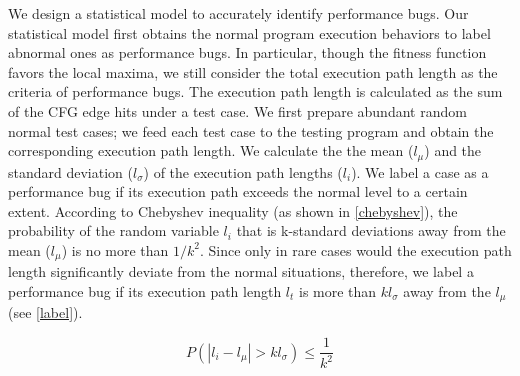 %
%

We design a statistical model to accurately identify performance bugs.
Our statistical model first obtains the normal program execution behaviors to label abnormal ones as performance bugs.
%
In particular, though the fitness function favors the local maxima, we still consider the total execution path length as the criteria of performance bugs.
%
The execution path length is calculated as the sum of the CFG edge hits under a test case.
%
We first prepare abundant random normal test cases;
%
we feed each test case to the testing program and obtain the corresponding execution path length.
%
We calculate the the mean ($l_{\mu}$) and the standard deviation ($l_{\sigma}$) of the execution path lengths ($l_i$).
%
We label a case as a performance bug if its execution path exceeds the normal level to a certain extent.
%
%
According to Chebyshev inequality (as shown in \autoref{chebyshev}),
%
the probability of the random variable $l_{i}$ that is k-standard deviations away from the mean ($l_{\mu}$) is no more than ${1}/{k^2}$.
%
Since only in rare cases would the execution path length significantly deviate from the normal situations,
%
therefore, we label a performance bug if its execution path length $l_{t}$ is more than $kl_{\sigma}$ away from the $l_{\mu}$ (see \autoref{label}).
%
%
%

\begin{equation} \label{chebyshev}
    P(|l_{i}-l_{\mu}| > k l_{\sigma}) \leq \frac{1}{k^2}
\end{equation}

